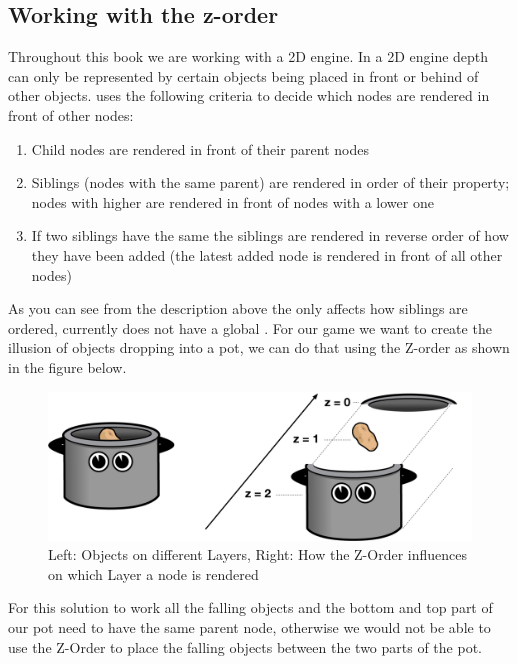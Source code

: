 \subsection{Working with the z-order}
Throughout this book we are working with a 2D engine. In a 2D engine depth can
only be represented by certain objects being placed in front or behind of other
objects. \cocos{} uses the following criteria to decide which nodes are rendered
in front of other nodes:
\begin{enumerate}
  \item Child nodes are rendered in front of their parent nodes
  \item Siblings (nodes with the same parent) are rendered in order of their
   property; nodes with higher  are
  rendered in front of nodes with a lower one
  \item If two siblings have the same  the siblings are
  rendered in reverse order of how they have been added (the latest added node
  is rendered in front of all other nodes)
\end{enumerate}

As you can see from the description above the  only affects
how siblings are ordered, \cocos{} currently does not have a global
. For our game we want to create the illusion of objects
dropping into a pot, we can do that using the \cocos{} Z-order as shown in
the figure below. 

\begin{figure}[H]
		\centering
		\includegraphics[width=0.9\linewidth]{images/Chapter3/drawing_order.png}
		\caption{Left: Objects on different Layers, Right: How the Z-Order influences
		on which Layer a node is rendered}
\end{figure}

For this solution to work all the falling objects and the bottom and top part of
our pot need to have the same parent node, otherwise we would not be able to use
the Z-Order to place the falling objects between the two parts of the pot. 

